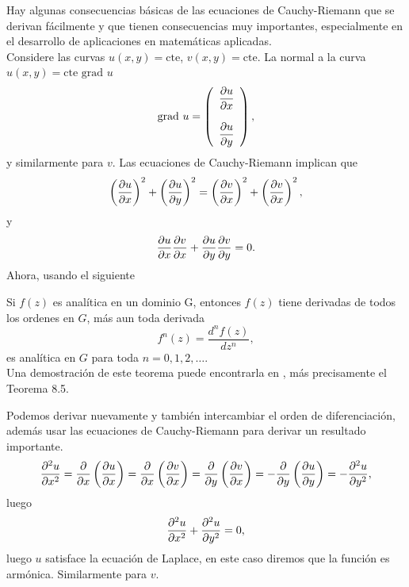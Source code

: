 Hay algunas consecuencias básicas de las ecuaciones de Cauchy-Riemann que se derivan fácilmente y que tienen consecuencias muy importantes, especialmente en el desarrollo de aplicaciones en matemáticas aplicadas.\\
Considere las curvas $u(x,y)=\mbox{cte}$, $v(x,y)=\mbox{cte}$. La normal a la curva $u(x,y)=\mbox{cte}$ $\mbox{grad } u$
\[
	\mbox{grad } u=\left(\begin{array}{c}
		\dfrac{\partial u}{\partial x}\\\\
		\dfrac{\partial u}{\partial y}
	\end{array}\right),
\]
y similarmente para $v$. Las ecuaciones de Cauchy-Riemann implican que 
$$\left(\dfrac{\partial u}{\partial x}\right)^2+\left(\dfrac{\partial u}{\partial y}\right)^2=\left(\dfrac{\partial v}{\partial x}\right)^2+\left(\dfrac{\partial v}{\partial x}\right)^2,$$
y $$\dfrac{\partial u}{\partial x}\dfrac{\partial v}{\partial x}+\dfrac{\partial u}{\partial y}\dfrac{\partial v}{\partial y}=0.$$
Ahora, usando el siguiente
\begin{teor}\label{Teor8.5silv}
	Si $f(z)$ es analítica en un dominio G, entonces $f(z)$ tiene derivadas de todos los ordenes en $G$, más aun toda derivada $$f^{n}(z)=\dfrac{d^n f(z)}{dz^n},$$ es analítica en $G$ para toda $n=0,1,2,\ldots$.\\
	Una demostración de este teorema puede encontrarla en \cite{silverman}, más precisamente el Teorema 8.5. 
\end{teor}
Podemos derivar nuevamente y también intercambiar el orden de diferenciación, además usar las ecuaciones de Cauchy-Riemann para derivar un resultado importante.
$$\dfrac{\partial^2 u}{\partial x^2}=\dfrac{\partial}{\partial x}\left(\dfrac{\partial u}{\partial x}\right)=\dfrac{\partial}{\partial x}\left(\dfrac{\partial v}{\partial x}\right)=\dfrac{\partial}{\partial y}\left(\dfrac{\partial v}{\partial x}\right)=-\dfrac{\partial}{\partial y}\left(\dfrac{\partial u}{\partial y}\right)=-\dfrac{\partial^2u}{\partial y^2},$$
luego
$$\dfrac{\partial^2 u}{\partial x^2}+\dfrac{\partial^2u}{\partial y^2}=0,$$
luego $u$ satisface la ecuación de Laplace, en este caso diremos que la función es armónica. Similarmente para $v$.

